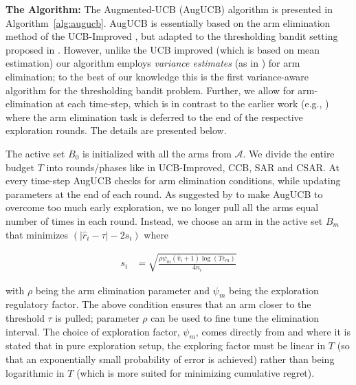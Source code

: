 \textbf{The Algorithm:} The Augmented-UCB (AugUCB) algorithm is presented in Algorithm~\ref{alg:augucb}.
AugUCB is essentially based on the arm elimination method of the UCB-Improved \cite{auer2010ucb}, but adapted to the thresholding bandit setting proposed in \cite{locatelli2016optimal}. However, unlike the UCB improved (which is based on mean estimation) our algorithm employs \emph{variance estimates} (as in \cite{audibert2009exploration}) for arm elimination; to the best of our knowledge this is the first variance-aware  algorithm for the thresholding bandit problem. Further, we allow for arm-elimination at each time-step, which is in contrast to the earlier work (e.g., \cite{auer2010ucb,chen2014combinatorial}) where the arm elimination task is deferred to the end of the respective exploration rounds. The details are presented below.

The active set $B_{0}$ is initialized with all the arms from $\mathcal{A}$. We divide the entire budget $T$ into rounds/phases like in UCB-Improved, CCB, SAR and CSAR. At every time-step AugUCB checks for arm elimination conditions, while updating parameters at the end of each round. As suggested by \cite{liu2016modification} to make AugUCB to overcome too much early exploration, we no longer pull all the arms equal number of times in each round. Instead, we choose an arm in the active set $B_m$ that minimizes $(|\hat{r}_{i} - \tau |-2s_i)$ where 
\begin{small}
\begin{align*}
s_i & = \sqrt{\frac{\rho\psi_m (\hat{v}_{i}+1) \log ( T \epsilon_{m})}{4 n_{i}}} %
\end{align*}
\end{small} 
with $\rho$ being the arm elimination parameter and $\psi_{m}$ being the exploration regulatory factor.
The above condition ensures that an arm closer to the threshold $\tau$ is pulled; 
parameter $\rho$ can be used to fine tune the elimination interval.
The choice of exploration factor, $\psi_m$,
comes directly from \cite{audibert2010best} and \cite{bubeck2011pure} where it is  stated that in pure exploration setup, the exploring factor must be linear in $T$ (so that an exponentially small probability of error is achieved) rather than being logarithmic in $T$ (which is more suited for minimizing cumulative regret).

